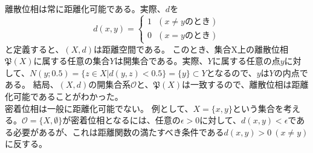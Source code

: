 \documentclass{jsarticle}
\begin{document}
\begin{table}[htb]
\end{table}


\subsection{}
離散位相は常に距離化可能である。実際、$d$を
\[d(x,y)=
\begin{cases}
1\ \ \ (x\neq yのとき)\\
0\ \ \ (x=yのとき) 
\end{cases}
\]
と定義すると、$(X,d)$は距離空間である。
このとき、集合X上の離散位相$\mathfrak{P}(X)$に属する任意の集合$Y$は開集合である。実際、$Y$に属する任意の点$y$に対して、$N(y;0.5)=\{z\in X|d(y,z)<0.5\}=\{y\}\subset Y$となるので、$y$は$Y$の内点である。
結局、$(X,d)$の開集合系$\mathcal{O}$と、$\mathfrak{P}(X)$は一致するので、離散位相は距離化可能であることがわかった。\\
密着位相は一般に距離化可能でない。
例として、$X=\{x,y\}$という集合を考える。$\mathcal{O}=\{X,\emptyset\}$が密着位相となるには、任意の$\epsilon>0$に対して、$d(x,y)<\epsilon$である必要があるが、これは距離関数の満たすべき条件である$d(x,y)>0\ (x\neq y)$に反する。


\end{document}
